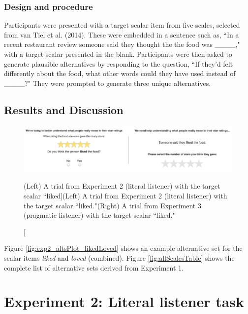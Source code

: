 \documentclass[10pt, letterpaper]{article}
\newenvironment{CodeChunk}{}{}
\begin{document}
\subsubsection{Design and procedure}\label{design-and-procedure}

Participants were presented with a target scalar item from five scales,
selected from {van Tiel} et al. (2014). These were embedded in a
sentence such as, ``In a recent restaurant review someone said they
thought the the food was \_\_\_\_," with a target scalar presented in
the blank. Participants were then asked to generate plausible
alternatives by responding to the question, ``If they'd felt differently
about the food, what other words could they have used instead of
\_\_\_\_?" They were prompted to generate three unique alternatives.

\subsection{Results and Discussion}\label{results-and-discussion}

\begin{CodeChunk}
\begin{figure}[t]

{\centering \includegraphics{figs/stimuli_exp1-1} 

}

\caption[(Left) A trial from Experiment 2 (literal listener) with the target scalar ``liked]{(Left) A trial from Experiment 2 (literal listener) with the target scalar ``liked."(Right) A trial from Experiment 3 (pragmatic listener) with the target scalar ``liked."}\label{fig:stimuli_exp1}
\end{figure}
\end{CodeChunk}

Figure \ref{fig:exp2_altsPlot_likedLoved} shows an example alternative
set for the scalar items \emph{liked} and \emph{loved} (combined).
Figure \ref{fig:allScalesTable} shows the complete list of alternative
sets derived from Experiment 1.

\section{Experiment 2: Literal listener
task}\label{experiment-2-literal-listener-task}
\end{document}
